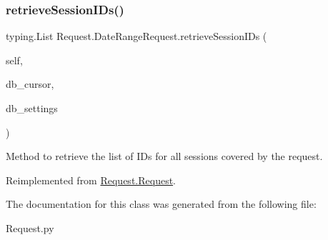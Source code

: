 \subsubsection{\texorpdfstring{retrieveSessionIDs()}{retrieveSessionIDs()}}
{\footnotesize\ttfamily  typing.\+List Request.\+Date\+Range\+Request.\+retrieve\+Session\+I\+Ds (\begin{DoxyParamCaption}\item[{}]{self,  }\item[{}]{db\+\_\+cursor,  }\item[{}]{db\+\_\+settings }\end{DoxyParamCaption})}



Method to retrieve the list of I\+Ds for all sessions covered by the request. 



Reimplemented from \mbox{\hyperlink{class_request_1_1_request_aa65df0d73c5d2524053dbedd666c7d9e}{Request.\+Request}}.



The documentation for this class was generated from the following file\+:\begin{DoxyCompactItemize}
\item 
Request.\+py\end{DoxyCompactItemize}
